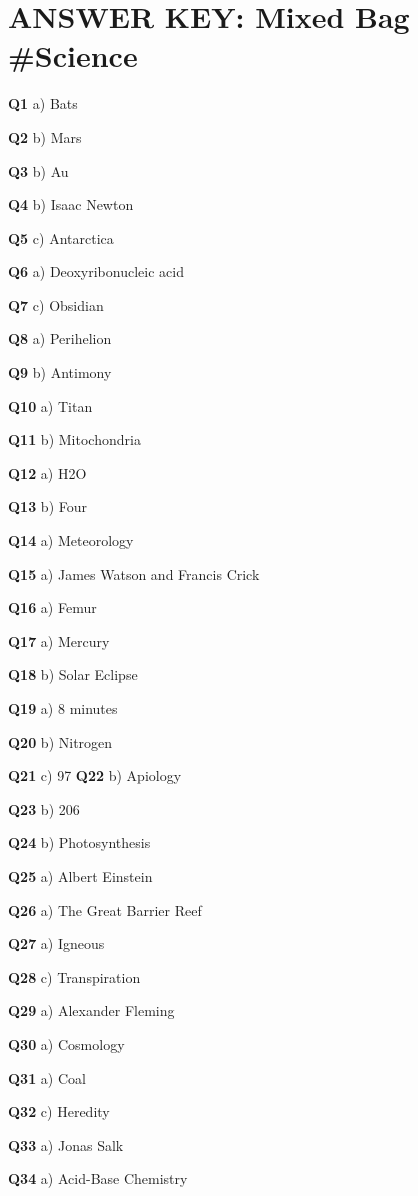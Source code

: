 \section{ANSWER KEY: Mixed Bag #Science}

\textbf{Q1} a) Bats\par
\textbf{Q2} b) Mars\par
\textbf{Q3} b) Au\par
\textbf{Q4} b) Isaac Newton\par
\textbf{Q5} c) Antarctica\par
\textbf{Q6} a) Deoxyribonucleic acid\par
\textbf{Q7} c) Obsidian\par
\textbf{Q8} a) Perihelion\par
\textbf{Q9} b) Antimony\par
\textbf{Q10} a) Titan\par
\textbf{Q11} b) Mitochondria\par
\textbf{Q12} a) H2O\par
\textbf{Q13} b) Four\par
\textbf{Q14} a) Meteorology\par
\textbf{Q15} a) James Watson and Francis Crick\par
\textbf{Q16} a) Femur\par
\textbf{Q17} a) Mercury\par
\textbf{Q18} b) Solar Eclipse\par
\textbf{Q19} a) 8 minutes\par
\textbf{Q20} b) Nitrogen\par
\textbf{Q21} c) 97%
\textbf{Q22} b) Apiology\par
\textbf{Q23} b) 206\par
\textbf{Q24} b) Photosynthesis\par
\textbf{Q25} a) Albert Einstein\par
\textbf{Q26} a) The Great Barrier Reef\par
\textbf{Q27} a) Igneous\par
\textbf{Q28} c) Transpiration\par
\textbf{Q29} a) Alexander Fleming\par
\textbf{Q30} a) Cosmology\par
\textbf{Q31} a) Coal\par
\textbf{Q32} c) Heredity\par
\textbf{Q33} a) Jonas Salk\par
\textbf{Q34} a) Acid-Base Chemistry\par
